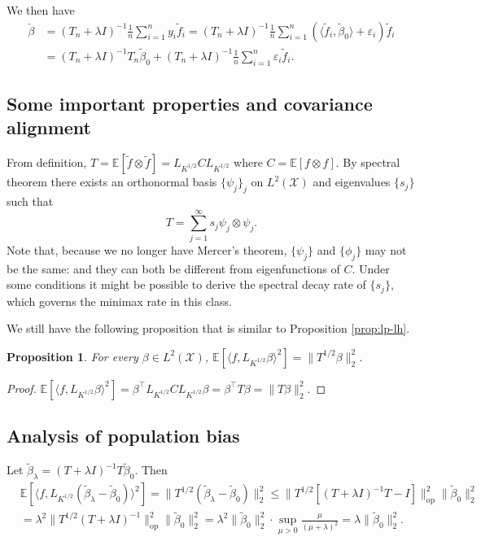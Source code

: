 \documentclass[11pt,a4paper]{article}
\renewcommand{\tilde}{\widetilde}
\theoremstyle{definition}
\theoremstyle{plain}
\newtheorem{proposition}{Proposition}[section]
\theoremstyle{remark}
\newcommand{\op}{\mathrm{op}}
\newcommand{\mX}{\mathcal X}
\newcommand{\lx}{L^2(\mX)}
\begin{document}
We then have
\begin{align*}
\check\beta &= (T_n+\lambda I)^{-1}\frac{1}{n}\sum_{i=1}^n y_i \tilde f_i = (T_n+\lambda I)^{-1}\frac{1}{n}\sum_{i=1}^n (\langle\tilde f_i,\tilde\beta_0\rangle + \varepsilon_i)\tilde f_i\\
&= (T_n+\lambda I)^{-1} T_n \tilde\beta_0 + (T_n+\lambda I)^{-1}\frac{1}{n}\sum_{i=1}^n\varepsilon_i\tilde f_i.
\end{align*}

\subsection{Some important properties and covariance alignment}

From definition, $T=\mathbb E[\tilde f\otimes \tilde f] = L_{K^{1/2}}CL_{K^{1/2}}$ where $C=\mathbb E[f\otimes f]$. By spectral theorem there exists an orthonormal basis $\{\psi_j\}_j$ on $\lx$ and
eigenvalues $\{s_j\}$ such that
$$
T = \sum_{j=1}^{\infty} s_j\psi_j\otimes\psi_j.
$$
Note that, because we no longer have Mercer's theorem, $\{\psi_j\}$ and $\{\phi_j\}$ may not be the same: and they can both be different from eigenfunctions of $C$. 
Under some conditions it might be possible to derive the spectral decay rate of $\{s_j\}$, which governs the minimax rate in this class.

We still have the following proposition that is similar to Proposition \ref{prop:lp-lh}.
\begin{proposition}
For every $\beta\in\lx$, $\mathbb E[\langle f,L_{K^{1/2}}\beta\rangle^2] = \|T^{1/2}\beta\|_2^2$.
\end{proposition}
\begin{proof}
$\mathbb E[\langle f,L_{K^{1/2}}\beta\rangle^2] = \beta^\top L_{K^{1/2}}CL_{K^{1/2}}\beta = \beta^\top T\beta = \|T\beta\|_2^2.$
\end{proof}

\subsection{Analysis of population bias}
Let $\tilde\beta_\lambda = (T+\lambda I)^{-1}T\tilde\beta_0$. Then
\begin{align*}
&\mathbb E[\langle f,L_{K^{1/2}}(\tilde\beta_\lambda-\tilde\beta_0)\rangle^2]= \|T^{1/2}(\tilde\beta_\lambda-\tilde\beta_0)\|_2^2 \leq \|T^{1/2}[(T+\lambda I)^{-1}T-I]\|_\op^2\|\tilde\beta_0\|_2^2\\
&= \lambda^2 \|T^{1/2}(T+\lambda I)^{-1}\|_\op^2\|\tilde\beta_0\|_2^2 = \lambda^2\|\tilde\beta_0\|_2^2\cdot \sup_{\mu>0}\frac{\mu}{(\mu+\lambda)^2} = \lambda\|\tilde\beta_0\|_2^2.
\end{align*}
\end{document}
